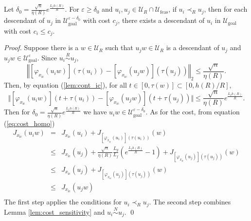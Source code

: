 \documentclass{llncs}
\begin{document}
%
\begin{lemma}
\label{lem:pruning}Let $\delta_0=\frac{\sqrt{n}}{\eta(R)}e^{\frac{L_{f}h(R)}{R}}$.
For $\varepsilon\geq \delta_0$ and $u_{i},u_{j}\in\mathcal{U}_{R}\cap\mathcal{U}_\mathrm{feas}$, if
$u_{i}\prec_{R}u_{j}$, then for each descendant of $u_{j}$ in $\mathcal{U}_\mathrm{goal}^{\varepsilon-\delta_0}$
with cost $c_{j}$, there exists a descendant of $u_{i}$ in $\mathcal{U}_\mathrm{goal}$
with cost $c_{i}\leq c_{j}$.\end{lemma}
\begin{proof}
Suppose there is a $w\in\mathcal{U}_{R}$ such that $u_{j}w\in\mathcal{U}_{R}$
is a descendant of $u_{j}$ and $u_{j}w\in\mathcal{U}_\mathrm{goal}^{\varepsilon}.$
 Since $u_{i}\overset{R}{\sim}u_{j}$,
\begin{equation}
\left\Vert[\varphi_{x_\mathrm{ic}}(u_{i}w)](\tau(u_{i}))-[\varphi_{x_\mathrm{ic}}(u_{j}w)](\tau(u_{j}))\right\Vert_2\leq \frac{\sqrt{n}}{\eta(R)}.
\end{equation}
Then, by equation (\ref{lem:cont_ic}), for all $t\in[0,\tau(w)]\subset[0,h(R)/R]$, 
\begin{equation}
\Vert[\varphi_{x_\mathrm{ic}}(u_{i}w)](t+\tau(u_{i}))-[\varphi_{x_\mathrm{ic}}(u_{j}w)](t+\tau(u_{j}))\Vert\leq\frac{\sqrt{n}}{\eta(R)}e^{\frac{L_{f}h(R)}{R}}.\label{eq:-8}
\end{equation}
Then for $\delta_0=\frac{\sqrt{n}}{\eta(R)}e^{\frac{L_{f}h(R)}{R}}$
we have $u_{i} w \in \mathcal{U}_\mathrm{goal}^{\varepsilon-\delta_0}.$ 
As for the cost, from equation (\ref{eq:cost_homo}) 
\begin{equation}
\begin{array}{rcl}
J_{x_\mathrm{ic}}(u_{i} w) & = & J_{x_\mathrm{ic}}(u_{i})+J_{[\varphi_{x_\mathrm{ic}}(u_{i})](\tau(u_{i}))}(w)\\
 & \leq & J_{x_\mathrm{ic}}(u_{j})+\frac{\sqrt{n}}{\eta(R)}\frac{L_{g}}{L_{f}}\left(e^{\frac{L_{f}h(R)}{R}}-1\right) +J_{[\varphi_{x_\mathrm{ic}}(u_{j})](\tau(u_{j}))}(w)\\
 & \leq & J_{x_\mathrm{ic}}(u_{j})+J_{[\varphi_{x_\mathrm{ic}}(u_{j})](\tau(u_{j}))}(w)\\
 & \leq  & J_{x_\mathrm{ic}}(u_{j}w)\\
\end{array}
\end{equation}
 The first step applies the conditions for $u_{i}\prec_{R}u_{j}$.
The second step combines Lemma \ref{lem:cost_sensitivity} and $u_{i}\overset{N}{\sim}u_{j}$. 
\qed
\end{proof}
\end{document}

